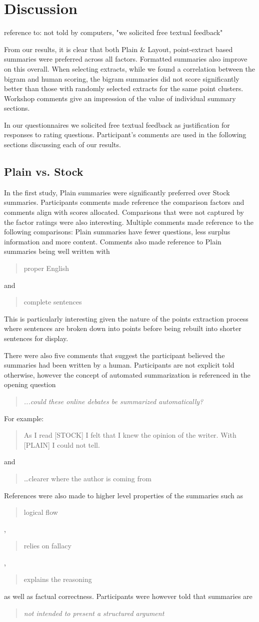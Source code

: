   \section{Discussion}
    reference to: not told by computers, "we solicited free textual feedback"

    From our results, it is clear that both Plain \& Layout, point-extract based summaries were preferred across all factors. Formatted summaries also improve on this overall. When selecting extracts, while we found a correlation between the bigram and human scoring, the bigram summaries did not score significantly better than those with randomly selected extracts for the same point clusters. Workshop comments give an impression of the value of individual summary sections.

    In our questionnaires we solicited free textual feedback as justification for responses to rating questions. Participant's comments are used in the following sections discussing each of our results.

    \tocless\subsection{Plain vs. Stock}
      In the first study, Plain summaries were significantly preferred over Stock summaries. Participants comments made reference the comparison factors and comments align with scores allocated. Comparisons that were not captured by the factor ratings were also interesting. Multiple comments made reference to the following comparisons: Plain summaries have fewer questions, less surplus information and more content. Comments also made reference to Plain summaries being well written with \blockquote{proper English} and \blockquote{complete sentences}. This is particularly interesting given the nature of the points extraction process where sentences are broken down into points before being rebuilt into shorter sentences for display.

      There were also five comments that suggest the participant believed the summaries had been written by a human. Participants are not explicit told otherwise, however the concept of automated summarization is referenced in the opening question \blockquote{\textit{...could these online debates be summarized automatically?}}. For example: \blockquote{As I read [STOCK] I felt that I knew the opinion of the writer. With [PLAIN] I could not tell.} and \blockquote{\dots clearer where the author is coming from}. References were also made to higher level properties of the summaries such as \blockquote{logical flow}, \blockquote{relies on fallacy}, \blockquote{explains the reasoning} as well as factual correctness. Participants were however told that summaries are \blockquote{\textit{not intended to present a structured argument}}.

